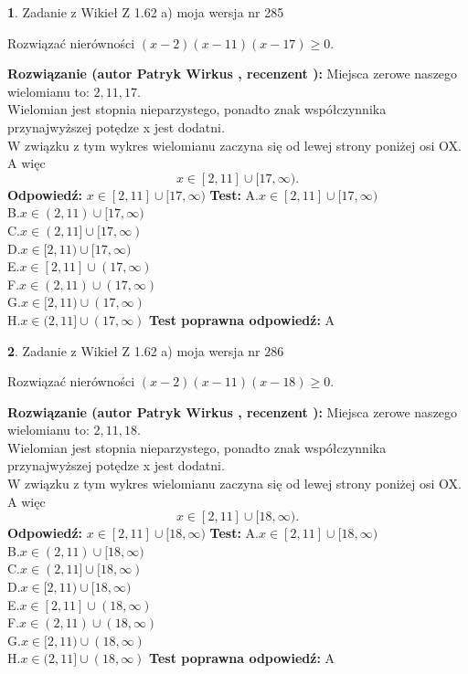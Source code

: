\documentclass[12pt, a4paper]{article}
\theoremstyle{definition} %
\newtheorem{zad}{}
\newcommand{\zadStart}[1]{\begin{zad}#1\newline}
\newcommand{\zadStop}{\end{zad}}
\newcommand{\rozwStart}[2]{\noindent \textbf{Rozwiązanie (autor #1 , recenzent #2): }\newline}
\newcommand{\rozwStop}{\newline}
\newcommand{\odpStart}{\noindent \textbf{Odpowiedź:}\newline}
\newcommand{\odpStop}{\newline}
\newcommand{\testStart}{\noindent \textbf{Test:}\newline}
\newcommand{\testStop}{\newline}
\newcommand{\kluczStart}{\noindent \textbf{Test poprawna odpowiedź:}\newline}
\newcommand{\kluczStop}{\newline}
\begin{document}
\zadStart{Zadanie z Wikieł Z 1.62 a) moja wersja nr 285}

Rozwiązać nierówności $(x-2)(x-11)(x-17)\ge0$.
\zadStop
\rozwStart{Patryk Wirkus}{}
Miejsca zerowe naszego wielomianu to: $2, 11, 17$.\\
Wielomian jest stopnia nieparzystego, ponadto znak współczynnika przy\linebreak najwyższej potędze x jest dodatni.\\ W związku z tym wykres wielomianu zaczyna się od lewej strony poniżej osi OX. A więc $$x \in [2,11] \cup [17,\infty).$$
\rozwStop
\odpStart
$x \in [2,11] \cup [17,\infty)$
\odpStop
\testStart
A.$x \in [2,11] \cup [17,\infty)$\\
B.$x \in (2,11) \cup [17,\infty)$\\
C.$x \in (2,11] \cup [17,\infty)$\\
D.$x \in [2,11) \cup [17,\infty)$\\
E.$x \in [2,11] \cup (17,\infty)$\\
F.$x \in (2,11) \cup (17,\infty)$\\
G.$x \in [2,11) \cup (17,\infty)$\\
H.$x \in (2,11] \cup (17,\infty)$
\testStop
\kluczStart
A
\kluczStop



\zadStart{Zadanie z Wikieł Z 1.62 a) moja wersja nr 286}

Rozwiązać nierówności $(x-2)(x-11)(x-18)\ge0$.
\zadStop
\rozwStart{Patryk Wirkus}{}
Miejsca zerowe naszego wielomianu to: $2, 11, 18$.\\
Wielomian jest stopnia nieparzystego, ponadto znak współczynnika przy\linebreak najwyższej potędze x jest dodatni.\\ W związku z tym wykres wielomianu zaczyna się od lewej strony poniżej osi OX. A więc $$x \in [2,11] \cup [18,\infty).$$
\rozwStop
\odpStart
$x \in [2,11] \cup [18,\infty)$
\odpStop
\testStart
A.$x \in [2,11] \cup [18,\infty)$\\
B.$x \in (2,11) \cup [18,\infty)$\\
C.$x \in (2,11] \cup [18,\infty)$\\
D.$x \in [2,11) \cup [18,\infty)$\\
E.$x \in [2,11] \cup (18,\infty)$\\
F.$x \in (2,11) \cup (18,\infty)$\\
G.$x \in [2,11) \cup (18,\infty)$\\
H.$x \in (2,11] \cup (18,\infty)$
\testStop
\kluczStart
A
\kluczStop
\end{document}
